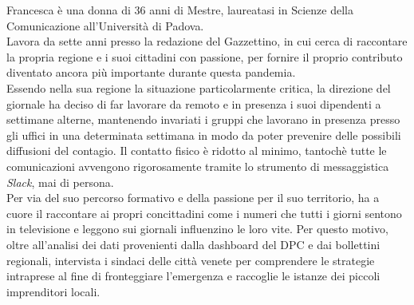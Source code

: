 Francesca è una donna di 36 anni di Mestre, laureatasi in Scienze della Comunicazione all'Università di Padova.\\ 
Lavora da sette anni presso la redazione del Gazzettino, in cui cerca di raccontare la propria regione e i suoi cittadini con passione, per fornire il proprio contributo diventato ancora più importante durante questa pandemia.\\ 
Essendo nella sua regione la situazione particolarmente critica, la direzione del giornale ha deciso di far lavorare da remoto e in presenza i suoi dipendenti a settimane alterne, mantenendo invariati i gruppi che lavorano in presenza presso gli uffici in una determinata settimana in modo da poter prevenire delle possibili diffusioni del contagio. Il contatto fisico è ridotto al minimo, tantochè tutte le comunicazioni avvengono rigorosamente tramite lo strumento di messaggistica \textit{Slack}, mai di persona.\\ 
Per via del suo percorso formativo e della passione per il suo territorio, ha a cuore il raccontare ai propri concittadini come i numeri che tutti i giorni sentono in televisione e leggono sui giornali influenzino le loro vite. Per questo motivo, oltre all'analisi dei dati provenienti dalla dashboard del DPC e dai bollettini regionali, intervista i sindaci delle città venete per comprendere le strategie intraprese al fine di fronteggiare l'emergenza e raccoglie le istanze dei piccoli imprenditori locali.

